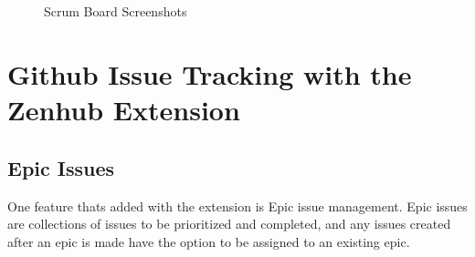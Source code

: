 \documentclass{scrreprt}
\begin{document}
\begin{figure}[ht!]
     \begin{center}
%
        \\%
        \\%
    \end{center}
    \caption{%
        Scrum Board Screenshots
     }%
   \label{fig:subfigures}
\end{figure}

\pagebreak

\section{Github Issue Tracking with the Zenhub Extension}

\subsection{Epic Issues}

One feature that\textsc{}s added with the extension is Epic issue management. Epic issues are collections of issues to be prioritized and completed, and any issues created after an epic is made have the option to be assigned to an existing epic.
\end{document}
